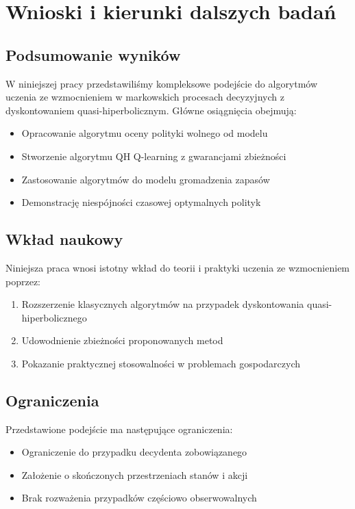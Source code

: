 \chapter{Wnioski i kierunki dalszych badań}

\section{Podsumowanie wyników}

W niniejszej pracy przedstawiliśmy kompleksowe podejście do algorytmów uczenia ze wzmocnieniem w markowskich procesach decyzyjnych z dyskontowaniem quasi-hiperbolicznym. Główne osiągnięcia obejmują:

\begin{itemize}
\item Opracowanie algorytmu oceny polityki wolnego od modelu
\item Stworzenie algorytmu QH Q-learning z gwarancjami zbieżności
\item Zastosowanie algorytmów do modelu gromadzenia zapasów
\item Demonstrację niespójności czasowej optymalnych polityk
\end{itemize}

\section{Wkład naukowy}

Niniejsza praca wnosi istotny wkład do teorii i praktyki uczenia ze wzmocnieniem poprzez:
\begin{enumerate}
\item Rozszerzenie klasycznych algorytmów na przypadek dyskontowania quasi-hiperbolicznego
\item Udowodnienie zbieżności proponowanych metod
\item Pokazanie praktycznej stosowalności w problemach gospodarczych
\end{enumerate}

\section{Ograniczenia}

Przedstawione podejście ma następujące ograniczenia:
\begin{itemize}
\item Ograniczenie do przypadku decydenta zobowiązanego
\item Założenie o skończonych przestrzeniach stanów i akcji
\item Brak rozważenia przypadków częściowo obserwowalnych
\end{itemize}

